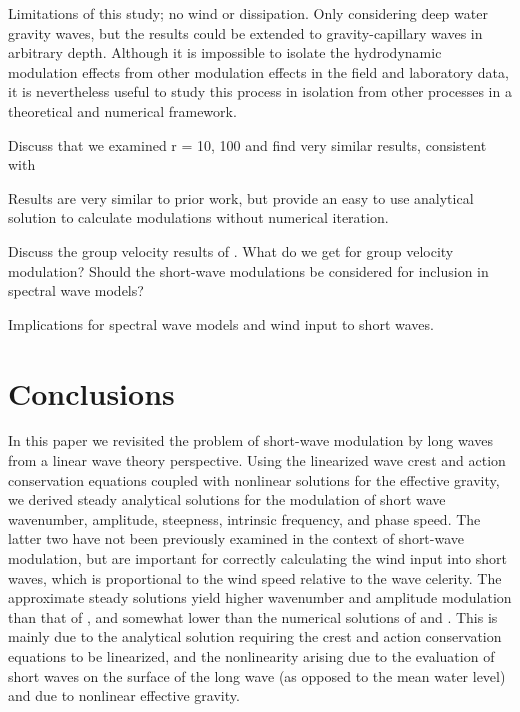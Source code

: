 \documentclass[lineno]{jfm}
\begin{document}
Limitations of this study; no wind or dissipation. Only considering deep water
gravity waves, but the results could be extended to gravity-capillary waves
in arbitrary depth.
Although it is impossible to isolate the hydrodynamic modulation effects
from other modulation effects in the field and laboratory data, it is
nevertheless useful to study this process in isolation from other processes
in a theoretical and numerical framework.

Discuss that we examined r = 10, 100 and find very similar results,
consistent with \citet{longuet1987propagation}

Results are very similar to prior work, but provide an easy to use analytical
solution to calculate modulations without numerical iteration.

Discuss the group velocity results of \citet{Willebrand1975energy}.
What do we get for group velocity modulation?
Should the short-wave modulations be considered for inclusion in spectral wave
models?

Implications for spectral wave models and wind input to short waves.

\section{Conclusions}
\label{section:conclusions}

In this paper we revisited the problem of short-wave modulation by long waves
from a linear wave theory perspective.
Using the linearized wave crest and action conservation equations coupled with
nonlinear solutions for the effective gravity, we derived steady analytical
solutions for the modulation of short wave wavenumber, amplitude, steepness,
intrinsic frequency, and phase speed.
The latter two have not been previously examined in the context of short-wave
modulation, but are important for correctly calculating the wind input into
short waves, which is proportional to the wind speed relative to the wave
celerity.
The approximate steady solutions yield higher wavenumber and amplitude
modulation than that of \citet{longuet1960changes}, and somewhat lower than 
the numerical solutions of \citet{longuet1987propagation} and
\citet{zhang1990evolution}.
This is mainly due to the analytical solution requiring the crest and action
conservation equations to be linearized, and the nonlinearity arising due
to the evaluation of short waves on the surface of the long wave (as opposed to
the mean water level) and due to nonlinear effective gravity.
\end{document}
